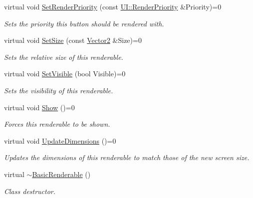 \begin{DoxyCompactItemize}
virtual void \hyperlink{classMezzanine_1_1UI_1_1BasicRenderable_a05be25ff56fbd498841c33da0cfe5410}{SetRenderPriority} (const \hyperlink{namespaceMezzanine_1_1UI_ac4c753eb6b5d66350a243acc9ce54130}{UI::RenderPriority} \&Priority)=0
\begin{DoxyCompactList}\small\item\em Sets the priority this button should be rendered with. \item\end{DoxyCompactList}\item 
virtual void \hyperlink{classMezzanine_1_1UI_1_1BasicRenderable_ace14123b4a7bdb83e4e86275823f7b6e}{SetSize} (const \hyperlink{classMezzanine_1_1Vector2}{Vector2} \&Size)=0
\begin{DoxyCompactList}\small\item\em Sets the relative size of this renderable. \item\end{DoxyCompactList}\item 
virtual void \hyperlink{classMezzanine_1_1UI_1_1BasicRenderable_a3dd62b1390d4f3931cfc8d0188cdcc7c}{SetVisible} (bool Visible)=0
\begin{DoxyCompactList}\small\item\em Sets the visibility of this renderable. \item\end{DoxyCompactList}\item 
\hypertarget{classMezzanine_1_1UI_1_1BasicRenderable_a122a5fe65efe74da68fa5998f07b31ef}{
virtual void \hyperlink{classMezzanine_1_1UI_1_1BasicRenderable_a122a5fe65efe74da68fa5998f07b31ef}{Show} ()=0}
\label{classMezzanine_1_1UI_1_1BasicRenderable_a122a5fe65efe74da68fa5998f07b31ef}

\begin{DoxyCompactList}\small\item\em Forces this renderable to be shown. \item\end{DoxyCompactList}\item 
virtual void \hyperlink{classMezzanine_1_1UI_1_1BasicRenderable_a446b43c6dde21c7f0c021ca6833f841d}{UpdateDimensions} ()=0
\begin{DoxyCompactList}\small\item\em Updates the dimensions of this renderable to match those of the new screen size. \item\end{DoxyCompactList}\item 
\hypertarget{classMezzanine_1_1UI_1_1BasicRenderable_af7b5ef0dc231b3e233ad892ce4c89320}{
virtual \hyperlink{classMezzanine_1_1UI_1_1BasicRenderable_af7b5ef0dc231b3e233ad892ce4c89320}{$\sim$BasicRenderable} ()}
\label{classMezzanine_1_1UI_1_1BasicRenderable_af7b5ef0dc231b3e233ad892ce4c89320}

\begin{DoxyCompactList}\small\item\em Class destructor. \item\end{DoxyCompactList}\end{DoxyCompactItemize}
